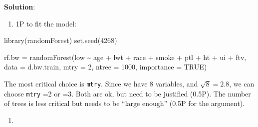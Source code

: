 \documentclass[
]{article}
\newenvironment{Shaded}{\begin{snugshade}}{\end{snugshade}}
\newcommand{\AttributeTok}[1]{\textcolor[rgb]{0.77,0.63,0.00}{#1}}
\newcommand{\ConstantTok}[1]{\textcolor[rgb]{0.00,0.00,0.00}{#1}}
\newcommand{\DecValTok}[1]{\textcolor[rgb]{0.00,0.00,0.81}{#1}}
\newcommand{\FunctionTok}[1]{\textcolor[rgb]{0.00,0.00,0.00}{#1}}
\newcommand{\NormalTok}[1]{#1}
\newcommand{\OtherTok}[1]{\textcolor[rgb]{0.56,0.35,0.01}{#1}}
\newcommand{\SpecialCharTok}[1]{\textcolor[rgb]{0.00,0.00,0.00}{#1}}
\newcommand{\StringTok}[1]{\textcolor[rgb]{0.31,0.60,0.02}{#1}}
\providecommand{\tightlist}{%
  \setlength{\itemsep}{0pt}\setlength{\parskip}{0pt}}
\begin{document}
\textbf{Solution}:

\begin{enumerate}
\def\labelenumi{(\roman{enumi})}
\tightlist
\item
  1P to fit the model:
\end{enumerate}

\begin{Shaded}
\begin{Highlighting}[]
\FunctionTok{library}\NormalTok{(randomForest)}
\FunctionTok{set.seed}\NormalTok{(}\DecValTok{4268}\NormalTok{)}

\NormalTok{rf.bw }\OtherTok{=} \FunctionTok{randomForest}\NormalTok{(low }\SpecialCharTok{\textasciitilde{}}\NormalTok{ age }\SpecialCharTok{+}\NormalTok{ lwt }\SpecialCharTok{+}\NormalTok{ race }\SpecialCharTok{+}\NormalTok{ smoke }\SpecialCharTok{+}\NormalTok{ ptl }\SpecialCharTok{+}\NormalTok{ ht }\SpecialCharTok{+}\NormalTok{ ui }\SpecialCharTok{+}
\NormalTok{    ftv, }\AttributeTok{data =}\NormalTok{ d.bw.train, }\AttributeTok{mtry =} \DecValTok{2}\NormalTok{, }\AttributeTok{ntree =} \DecValTok{1000}\NormalTok{, }\AttributeTok{importance =} \ConstantTok{TRUE}\NormalTok{)}
\end{Highlighting}
\end{Shaded}

The most critical choice is \texttt{mtry}. Since we have 8 variables,
and \(\sqrt{8}=2.8\), we can choose \texttt{mtry} =2 or =3. Both are ok,
but need to be justified (0.5P). The number of trees is less critical
but needs to be ``large enough'' (0.5P for the argument).

\begin{enumerate}
\def\labelenumi{(\roman{enumi})}
\setcounter{enumi}{1}
\tightlist
\item
\end{enumerate}

\begin{Shaded}
\end{Shaded}
\end{document}

